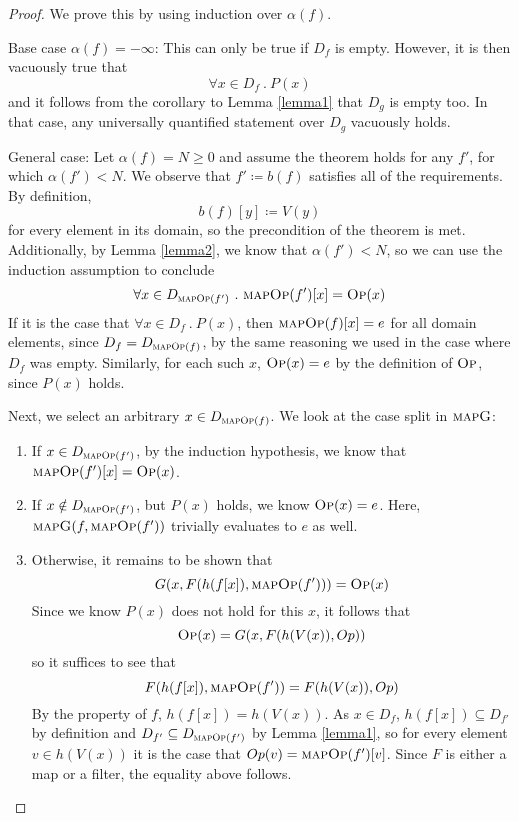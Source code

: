 \documentclass{article}
\newcommand{\iteDef}[4]{
  #1 \coloneqq \left\{
\begin{array}{ll}
      #2 &; #3 \\
      #4 &; \text{otherwise}\\
\end{array} 
\right. 
}
\newcommand{\op}{\textsc{Op}}
\newcommand{\mop}{\textsc{mapOp}}
\newcommand{\mapg}{\textsc{mapG}}
\begin{document}
\begin{proof}
We prove this by using induction over $\alpha(f)$.

Base case $\alpha(f) = -\infty$: This can only be true if $D_f$ is empty. However, it is then vacuously true that 
\[
\forall x \in D_f \ .\ P(x)
\]
and it follows from the corollary to Lemma \ref{lemma1} that $D_g$ is empty too. In that case, any universally quantified statement over $D_g$ vacuously holds.

General case: Let $\alpha(f) = N \ge 0$ and assume the theorem holds for any $f'$, for which $\alpha(f') < N$.
We observe that $f' \coloneqq b(f)$ satisfies all of the requirements. By definition, 
\[
b(f)[y] \coloneqq V(y)
\]
for every element in its domain, so the precondition of the theorem is met. Additionally, by Lemma \ref{lemma2}, we know that $\alpha(f') < N$, so we can use the induction assumption to conclude 
\[
\forall x \in D_{\mop(f')} \ .\ \mop(f')[x] = \op(x)
\]
If it is the case that $\forall x \in D_f \ .\ P(x)$, then $\mop(f)[x] = e$ for all domain elements, since 
$D_f = D_{\mop(f)}$, by the same reasoning we used in the case where $D_f$ was empty. Similarly, for each such $x$, $\op(x) = e$ by the definition of $\op$, since $P(x)$ holds.

Next, we select an arbitrary $x \in D_{\mop(f)}$. We look at the case split in $\mapg$:
\begin{enumerate}
\item If $x \in D_{\mop(f')}$, by the induction hypothesis, we know that $\mop(f')[x] = \op(x)$.
\item If $x \notin D_{\mop(f')}$, but $P(x)$ holds, we know $\op(x) = e$. Here, $\mapg(f, \mop(f'))$ trivially evaluates to $e$ as well.
\item Otherwise, it remains to be shown that
\[
G(x, F(h(f[x]), \mop(f'))) = \op(x)
\]
Since we know $P(x)$ does not hold for this $x$, it follows that
\[
\op(x) = G(x, F(h(V(x)), Op))
\]
so it suffices to see that 
\[
F(h(f[x]), \mop(f')) = F(h(V(x)), Op)
\]
By the property of $f$, $h(f[x]) = h(V(x))$. As $x \in D_f$, $h(f[x]) \subseteq D_{f'}$ by definition and $D_{f'} \subseteq D_{\mop(f')}$ by Lemma \ref{lemma1}, so for every element $v \in h(V(x))$ it is the case that $Op(v) = \mop(f')[v]$. Since $F$ is either a map or a filter, the equality above follows.

\end{enumerate}

\end{proof}
\end{document}

